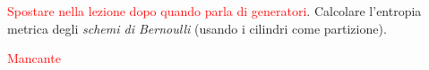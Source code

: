 \begin{exercise}
    \textcolor{red}{Spostare nella lezione dopo quando parla di generatori}.
    Calcolare l'entropia metrica degli \emph{schemi di Bernoulli} (usando i cilindri come partizione).
\end{exercise}
\begin{solution}
    \textcolor{red}{Mancante}
\end{solution}
